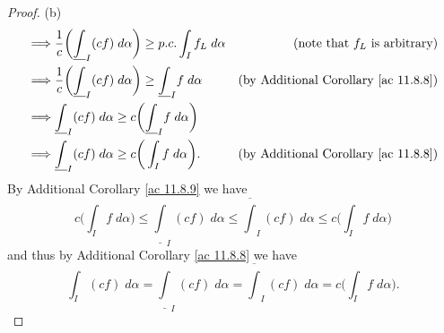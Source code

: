 \begin{proof}{(b)}
\begin{align*}
        \implies & \frac{1}{c} \bigg(\underline{\int}_I (cf) \; d \alpha\bigg) \geq p.c. \int_I f_L \; d \alpha      & \text{(note that \(f_L\) is arbitrary)}             \\
        \implies & \frac{1}{c} \bigg(\underline{\int}_I (cf) \; d \alpha\bigg) \geq \underline{\int}_I f \; d \alpha & \text{(by Additional Corollary \ref{ac 11.8.8})}    \\
        \implies & \underline{\int}_I (cf) \; d \alpha \geq c\bigg(\underline{\int}_I f \; d \alpha\bigg)                                                                  \\
        \implies & \underline{\int}_I (cf) \; d \alpha \geq c\bigg(\int_I f \; d \alpha\bigg).                       & \text{(by Additional Corollary \ref{ac 11.8.8})}
    \end{align*}
    By Additional Corollary \ref{ac 11.8.9} we have
    \[
        c\bigg(\int_I f \; d \alpha\bigg) \leq \underline{\int}_I (cf) \; d \alpha \leq \overline{\int}_I (cf) \; d \alpha \leq c\bigg(\int_I f \; d \alpha\bigg)
    \]
    and thus by Additional Corollary \ref{ac 11.8.8} we have
    \[
        \int_I (cf) \; d \alpha = \underline{\int}_I (cf) \; d \alpha = \overline{\int}_I (cf) \; d \alpha = c\bigg(\int_I f \; d \alpha\bigg).
    \]


\end{proof}
